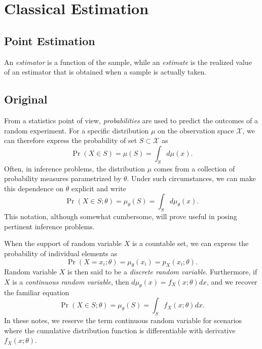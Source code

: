 \chapter{Classical Estimation}

\section{Point Estimation}

An \emph{estimator} is a function of the sample, while an \emph{estimate} is the realized value of an estimator that is obtained when a sample is actually taken.

\section{Original}

From a statistics point of view, \emph{probabilities} are used to predict the outcomes of a random experiment.
For a specific distribution $\mu$ on the observation space $\mathcal{X}$, we can therefore express the probability of set $S \subset \mathcal{X}$ as
\begin{equation*}
\Pr (X \in S) = \mu (S) = \int_S d\mu (x) .
\end{equation*}
Often, in inference problems, the distribution $\mu$ comes from a collection of probability measures parametrized by $\theta$.
Under such circumstances, we can make this dependence on $\theta$ explicit and write
\begin{equation*}
\Pr (X \in S ; \theta) = \mu_{\theta} (S) = \int_S d\mu_{\theta}(x) .
\end{equation*}
This notation, although somewhat cumbersome, will prove useful in posing pertinent inference problems.

When the support of random variable $X$ is a countable set, we can express the probability of individual elements as
\begin{equation*}
\Pr (X = x_i; \theta) = \mu_{\theta} (x_i) = p_{X} (x_i ; \theta) .
\end{equation*}
Random variable $X$ is then said to be a \emph{discrete random variable}.
Furthermore, if $X$ is a \emph{continuous random variable}, then $d\mu_{\theta} (x) = f_X (x ; \theta) dx$, and we recover the familiar equation
\begin{equation*}
\Pr (X \in S ; \theta) = \mu_{\theta} (S) = \int_{S} f_X (x; \theta) dx .
\end{equation*}
In these notes, we reserve the term continuous random variable for scenarios where the cumulative distribution function is differentiable with derivative $f_X (x; \theta)$.

